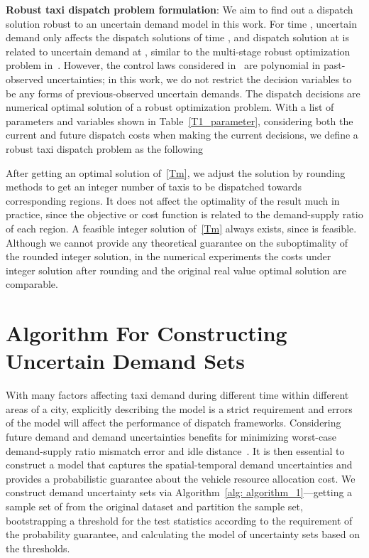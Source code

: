 \documentclass[10pt,twocolumn,twoside,english]{IEEEtran}
\begin{document}
\textbf{Robust taxi dispatch problem formulation}:
We aim to find out a dispatch solution robust to an uncertain demand model in this work. For time , uncertain demand  only affects the dispatch solutions of time , and dispatch solution at  is related to uncertain demand at , similar to the multi-stage robust optimization problem in~\cite{multistage}. However, the control laws considered in~\cite{multistage} are polynomial in past-observed uncertainties; in this work, we do not restrict the decision variables to be any forms of previous-observed uncertain demands. The dispatch decisions are numerical optimal solution of a robust optimization problem. With a list of parameters and variables shown in Table~\ref{T1_parameter}, considering both the current and future dispatch costs when making the current decisions, we define a robust taxi dispatch problem as the following

After getting an optimal solution  of~\eqref{Tm}, we adjust the solution by rounding methods to get an integer number of taxis to be dispatched towards corresponding regions. It does not affect the optimality of the result much in practice, since the objective or cost function is related to the demand-supply ratio of each region. A feasible integer solution of~\eqref{Tm} always exists, since  is feasible. Although we cannot provide any theoretical guarantee on the suboptimality of the rounded integer solution, in the numerical experiments the costs under integer solution after rounding and the original real value optimal solution are comparable.

\section{Algorithm For Constructing Uncertain Demand Sets}
\label{sec:algorithm1}
With many factors affecting taxi demand during different time within different areas of a city, explicitly describing the model is a strict requirement and errors of the model will affect the performance of dispatch frameworks. Considering future demand and demand uncertainties benefits for minimizing worst-case demand-supply ratio mismatch error and idle distance~\cite{taxi_Feiiccps15, Miao_tase16}. It is then essential to construct a model that captures the spatial-temporal demand uncertainties and provides a probabilistic guarantee about the vehicle resource allocation cost. We construct demand uncertainty sets via Algorithm~\ref{alg: algorithm_1}---getting a sample set of  from the original dataset and partition the sample set, bootstrapping a threshold for the test statistics according to the requirement of the probability guarantee, and calculating the model of uncertainty sets based on the thresholds. 
\end{document}
